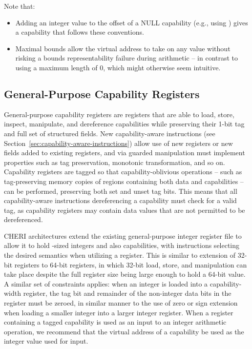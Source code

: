 Note that:

\begin{itemize}
\item Adding an integer value to the offset of a NULL capability (e.g., using
  ) gives a capability that follows these
  conventions.
\item Maximal bounds allow the virtual address to take on any value without
  risking a bounds representability failure during arithmetic -- in contrast
  to using a maximum length of 0, which might otherwise seem intuitive.
\end{itemize}

\subsection{General-Purpose Capability Registers}

General-purpose capability registers are registers that are able to load,
store, inspect,
manipulate, and dereference capabilities while preserving their 1-bit tag and
full set of structured fields.
New capability-aware instructions (see
Section~\ref{sec:capability-aware-instructions}) allow use of new registers or
new fields added to existing registers, and via guarded manipulation must
implement properties such as tag preservation, monotonic transformation, and
so on.
Capability registers are tagged so that capability-oblivious operations --
such as tag-preserving memory copies of regions containing both data and
capabilities -- can be performed, preserving both set and unset tag bits.
This means that all capability-aware instructions dereferencing a capability
must check for a valid tag, as capability registers may contain data values
that are not permitted to be dereferenced.

CHERI architectures extend the existing general-purpose integer
register file to allow it to hold \xlen{}-sized integers and also capabilities, with
instructions selecting the desired semantics when utilizing a register.
This is similar to extension of 32-bit registers to 64-bit registers, in which
32-bit load, store, and manipulation can take place despite the full register
size being large enough to hold a 64-bit value.
A similar set of constraints applies: when an integer is loaded into a
capability-width register, the tag bit and remainder of the non-integer data
bits in the register must be zeroed, in similar manner to the use of zero or
sign extension when loading a smaller integer into a larger integer register.
When a register containing a tagged capability is used as an input to an
integer arithmetic operation, we recommend that the virtual address of a
capability be used as the integer value used for input.

